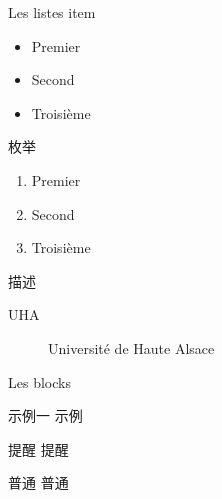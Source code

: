 \documentclass[10pt]{beamer}
\begin{document}
\begin{frame}{Les listes}
	item
	\begin{itemize}
		\item Premier
		\item Second
		\item Troisième
	\end{itemize}

	枚举
	\begin{enumerate}
		\item Premier
		\item Second
		\item Troisième
	\end{enumerate}

	描述
	\begin{description}
		\item [UHA] Université de Haute Alsace
	\end{description}
\end{frame}

\begin{frame}{Les blocks}
	\begin{exampleblock}{示例一}
		示例
	\end{exampleblock}
	\begin{alertblock}{提醒}
		提醒
	\end{alertblock}
	\begin{block}{普通}
		普通
	\end{block}
\end{frame}
\end{document}
